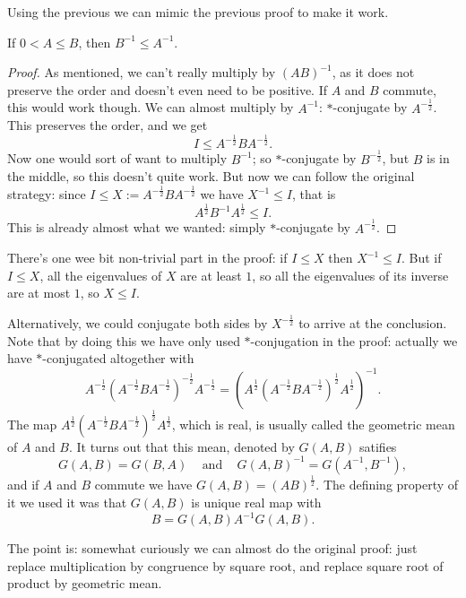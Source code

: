 Using the previous we can mimic the previous proof to make it work.

\begin{lause}
	If $0 < A \leq B$, then $B^{-1} \leq A^{-1}$.
\end{lause}
\begin{proof}
	As mentioned, we can't really multiply by $(A B)^{-1}$, as it does not preserve the order and doesn't even need to be positive. If $A$ and $B$ commute, this would work though. We can almost multiply by $A^{-1}$: $*$-conjugate by $A^{-\frac{1}{2}}$. This preserves the order, and we get
	\[
		I \leq A^{-\frac{1}{2}} B A^{-\frac{1}{2}}.
	\]
	Now one would sort of want to multiply $B^{-1}$; so $*$-conjugate by $B^{-\frac{1}{2}}$, but $B$ is in the middle, so this doesn't quite work. But now we can follow the original strategy: since $I \leq X := A^{-\frac{1}{2}} B A^{-\frac{1}{2}}$ we have $X^{-1} \leq I$, that is
	\[
		A^{\frac{1}{2}} B^{-1} A^{\frac{1}{2}} \leq I.
	\]
	This is already almost what we wanted: simply $*$-conjugate by $A^{-\frac{1}{2}}$.
\end{proof}

There's one wee bit non-trivial part in the proof: if $I \leq X$ then $X^{-1} \leq I$. But if $I \leq X$, all the eigenvalues of $X$ are at least $1$, so all the eigenvalues of its inverse are at most $1$, so $X \leq I$.

\begin{huom}

Alternatively, we could conjugate both sides by $X^{-\frac{1}{2}}$ to arrive at the conclusion. Note that by doing this we have only used $*$-conjugation in the proof: actually we have $*$-conjugated altogether with 
\[
	A^{-\frac{1}{2}} (A^{-\frac{1}{2}}B A^{-\frac{1}{2}})^{-\frac{1}{2}} A^{-\frac{1}{2}} = (A^{\frac{1}{2}} (A^{-\frac{1}{2}}B A^{-\frac{1}{2}})^{\frac{1}{2}} A^{\frac{1}{2}})^{-1}.
\]
The map $A^{\frac{1}{2}} (A^{-\frac{1}{2}}B A^{-\frac{1}{2}})^{\frac{1}{2}} A^{\frac{1}{2}}$, which is real, is usually called the geometric mean of $A$ and $B$. It turns out that this mean, denoted by $G(A, B)$ satifies
\[
	G(A, B) = G(B, A) \;\;\; \text{ and } \;\;\; G(A, B)^{-1} = G(A^{-1}, B^{-1}),
\]
and if $A$ and $B$ commute we have $G(A, B) = (A B)^{\frac{1}{2}}$. The defining property of it we used it was that $G(A, B)$ is unique real map with
\[
	B = G(A, B) A^{-1} G(A, B).
\]

The point is: somewhat curiously we can almost do the original proof: just replace multiplication by congruence by square root, and replace square root of product by geometric mean.

\end{huom}

